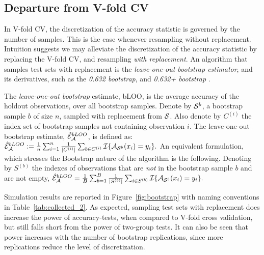 \documentclass[]{bio}
\begin{document}
\subsection{Departure from V-fold CV}
\label{sec:bootstrap}

In V-fold CV, the discretization of the accuracy statistic is governed by the number of samples. 
This is the case whenever resampling without replacement. 
Intuition suggests we may alleviate the discretization of the accuracy statistic by replacing the V-fold CV, and resampling \emph{with replacement}.
An algorithm that samples test sets with replacement is the \emph{leave-one-out bootstrap estimator},  and its derivatives, such as the \emph{0.632 bootstrap}, and \emph{0.632+ bootstrap} \cite[Sec 7.11]{hastie_elements_2003}.
\begin{definition}[bLOO]
	\label{def:bloo}
	The \emph{leave-one-out bootstrap} estimate, bLOO, is the average accuracy of the holdout observations, over all bootstrap samples. 
	Denote by $\mathcal{S}^b$, a bootstrap sample $b$ of size $n$, sampled with replacement from $\mathcal{S}$. 
	Also denote by $C^{(i)}$ the index set of bootstrap samples not containing observation $i$.
	The leave-one-out bootstrap estimate, $\hat{\mathcal{E}}_{\mathcal{A}}^{bLOO}$,  is defined as:
	$\hat{\mathcal{E}}_{\mathcal{A}}^{bLOO}:= \frac 1n \sum_{i=1}^{n} \frac{1}{|C^{(i)}|} \sum_{b \in C^{(i)}} \mathcal{I}{\{ \mathcal{A}_{\mathcal{S}^b}(x_i)=y_i \}}.$
	An equivalent formulation, which stresses the Bootstrap nature of the algorithm is the following. 
	Denoting by $S^{(b)}$ the indexes of observations that are \emph{not} in the bootstrap sample $b$ and are not empty, 
	$\hat{\mathcal{E}}_{\mathcal{A}}^{bLOO} = \frac 1B \sum_{b=1}^{B} \frac{1}{|S^{(b)}|} \sum_{i \in S^{(b)}} \mathcal{I}{\{ \mathcal{A}_{\mathcal{S}^b}(x_i)=y_i \}}.$
\end{definition}


Simulation results are reported in Figure~\ref{fig:bootstrap} with naming conventions in Table~\ref{tab:collected_2}.
As expected, sampling test sets with replacement does increase the power of accuracy-tests, when compared to V-fold cross validation, but still falls short from the power of two-group tests. 
It can also be seen that power increases with the number of bootstrap replications, since more replications reduce the level of discretization.

\bigskip
\end{document}
